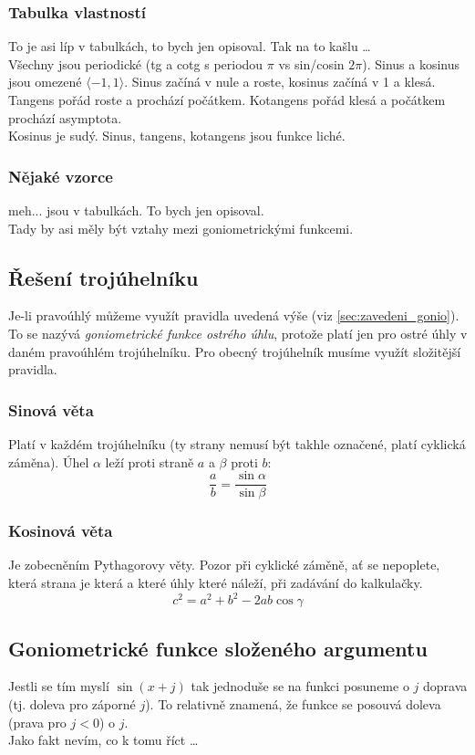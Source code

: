 \documentclass[12pt]{article}
\begin{document}
\subsubsection{Tabulka vlastností}
To je asi líp v tabulkách, to bych jen opisoval. Tak na to kašlu \dots \\
Všechny jsou periodické (tg a cotg s periodou $\pi$ vs sin/cosin $2\pi$). Sinus a kosinus jsou omezené $\langle -1, 1 \rangle$. Sinus začíná v nule a roste, kosinus začíná v 1 a klesá. Tangens pořád roste a prochází počátkem. Kotangens pořád klesá a počátkem prochází asymptota.\\
Kosinus je sudý. Sinus, tangens, kotangens jsou funkce liché.
\subsubsection{Nějaké vzorce}
meh... jsou v tabulkách. To bych jen opisoval.\\
Tady by asi měly být vztahy mezi goniometrickými funkcemi.
\subsection{Řešení trojúhelníku}
Je-li pravoúhlý můžeme využít pravidla uvedená výše (viz \ref{sec:zavedeni_gonio}). To se nazývá \emph{goniometrické funkce ostrého úhlu}, protože platí jen pro ostré úhly v daném pravoúhlém trojúhelníku. Pro obecný trojúhelník musíme využít složitější pravidla.
\subsubsection{Sinová věta}
Platí v každém trojúhelníku (ty strany nemusí být takhle označené, platí cyklická záměna). Úhel $\alpha$ leží proti straně $a$ a $\beta$ proti $b$:
\begin{equation}
\frac{a}{b} = \frac{\sin \alpha}{\sin \beta}
\end{equation}
\subsubsection{Kosinová věta}
Je zobecněním Pythagorovy věty. Pozor při cyklické záměně, ať se nepoplete, která strana je která a které úhly které náleží, při zadávání do kalkulačky.
\begin{equation}
c^2 = a^2 + b^2 - 2ab\cos\gamma
\end{equation} 
\subsection{Goniometrické funkce složeného argumentu}
Jestli se tím myslí $\sin (x + j)$ tak jednoduše se na funkci posuneme o $j$ doprava (tj. doleva pro záporné $j$). To relativně znamená, že funkce se posouvá doleva (prava pro $j<0$) o $j$.\\
Jako fakt nevím, co k tomu říct \dots
\end{document}
